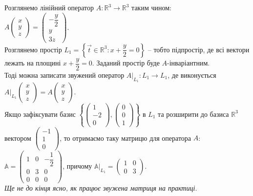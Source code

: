 \documentclass{math_library}
\begin{document}
\iffalse
\begin{example}
Розглянемо лінійний оператор $A: \mathbb{R}^3 \to \mathbb{R}^3$ таким чином:\\
$A \begin{pmatrix}
x \\ y \\ z
\end{pmatrix} = \begin{pmatrix}
-\dfrac{y}{2} \\ y \\ 3z
\end{pmatrix}$.\\
Розглянемо простір $L_1 = \left\{ \vec{t} \in \mathbb{R}^3 : x + \dfrac{y}{2} = 0 \right\}$ -- тобто підпростір, де всі вектори лежать на площині $x + \dfrac{y}{2} = 0$. Заданий простір буде $A$-інваріантним.\\
Тоді можна записати звужений оператор $A|_{L_1}: L_1 \to L_1$, де виконується $A|_{L_1} \begin{pmatrix}
x \\ y \\ z
\end{pmatrix} = A\begin{pmatrix}
x \\ y \\ z
\end{pmatrix}$.\\
Якщо зафіксувати базис $\left\{ \begin{pmatrix}
1 \\ -2 \\ 0
\end{pmatrix}, \begin{pmatrix}
0 \\ 0 \\ 1
\end{pmatrix} \right\}$ в $L_1$ та розширити до базиса $\mathbb{R}^3$ вектором $\begin{pmatrix}
-1 \\ 1 \\ 0
\end{pmatrix}$, то отримаємо таку матрицю для оператора $A$:\\
$\mathbb{A} = \begin{pmatrix}
1 & 0 & -\dfrac{1}{2} \\
0 & 3 & 0 \\
0 & 0 & 0
\end{pmatrix}$, причому $\mathbb{A}|_{L_1} = \begin{pmatrix}
1 & 0 \\
0 & 3
\end{pmatrix}$.\\
\textit{Ще не до кінця ясно, як працює звужена матриця на практиці.}
\end{example}
\end{document}
